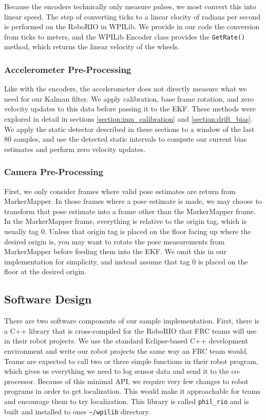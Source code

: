 \documentclass{article}
\begin{document}
      Because the encoders technically only measure pulses, we most convert this into linear speed. The step of converting ticks to a linear elocity of radians per second is performed on the RoboRIO in WPILib. We provide in our code the conversion from ticks to meters, and the WPILib Encoder class provides the \texttt{GetRate()} method, which returns the linear velocity of the wheels.

    \subsubsection{Accelerometer Pre-Processing}

      Like with the encoders, the accelerometer does not directly measure what we need for our Kalman filter. We apply calibration, base frame rotation, and zero velocity updates to this data before passing it to the EKF. These methods were explored in detail in sections \ref{section:imu_calibration} and \ref{section:drift_bias}. We apply the static detector described in these sections to a window of the last $80$ samples, and use the detected static intervals to compute our current bias estimates and perform zero velocity updates.

    \subsubsection{Camera Pre-Processing}

      First, we only consider frames where valid pose estimates are return from MarkerMapper. In those frames where a pose estimate is made, we may choose to transform that pose estimate into a frame other than the MarkerMapper frame. In the MarkerMapper frame, everything is relative to the origin tag, which is usually tag 0. Unless that origin tag is placed on the floor facing up where the desired origin is, you may want to rotate the pose measurements from MarkerMapper before feeding them into the EKF. We omit this in our implementation for simplicity, and instead assume that tag 0 is placed on the floor at the desired origin.

  \subsection{Software Design}

    There are two software components of our sample implementation. First, there is a C++ library that is cross-compiled for the RoboRIO that FRC teams will use in their robot projects. We use the standard Eclipse-based C++ development environment and write our robot projects the same way an FRC team would. Teams are expected to call two or three simple functions in their robot program, which gives us everything we need to log sensor data and send it to the co-processor. Because of this minimal API, we require very few changes to robot programs in order to get localization. This would make it approachable for teams and encourage them to try localization. This library is called \texttt{phil\_rio} and is built and installed to ones \texttt{\textasciitilde/wpilib} directory.
\end{document}
